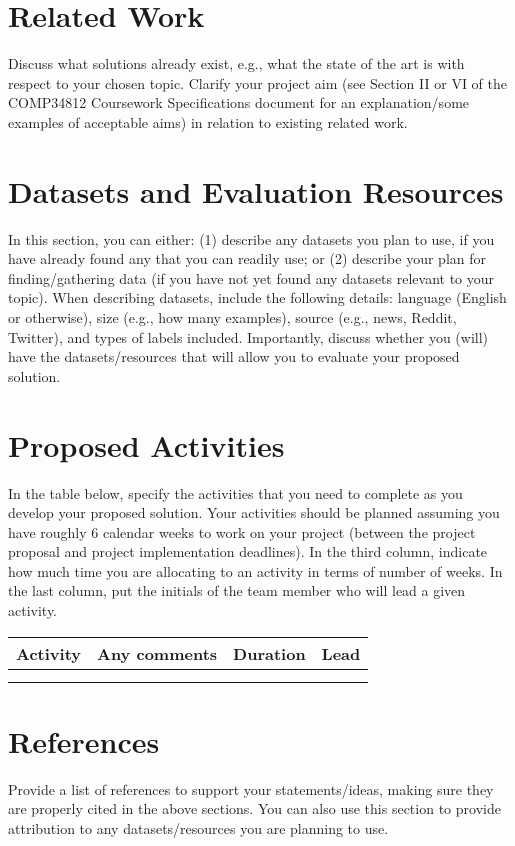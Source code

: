 \documentclass[11pt]{article}
\begin{document}
\section{Related Work}
Discuss what solutions already exist, e.g., what the state of the art is with respect to your chosen topic. Clarify your project aim (see Section II or VI of the COMP34812 Coursework Specifications document for an explanation/some examples of acceptable aims) in relation to existing related work.

\section{Datasets and Evaluation Resources}
In this section, you can either: (1) describe any datasets you plan to use, if you have already found any that you can readily use; or (2) describe your plan for finding/gathering data (if you have not yet found any datasets relevant to your topic). When describing datasets, include the following details: language (English or otherwise), size (e.g., how many examples), source (e.g., news, Reddit, Twitter), and types of labels included. Importantly, discuss whether you (will) have the datasets/resources that will allow you to evaluate your proposed solution. 



\section{Proposed Activities}
In the table below, specify the activities that you need to complete as you develop your proposed solution. Your activities should be planned assuming you have roughly 6 calendar weeks to work on your project (between the project proposal and project implementation deadlines). In the third column, indicate how much time you are allocating to an activity in terms of number of weeks. In the last column, put the initials of the team member who will lead a given activity.

\begin{table}[h]
\centering
\begin{tabular}{|l|l|c|c|}
\hline
\textbf{Activity} & \textbf{Any comments} & \textbf{Duration} & \textbf{Lead}\\
\hline
& & & \\
\hline
& & & \\
\hline
\end{tabular}
\end{table}


\section*{References}
Provide a list of references to support your statements/ideas, making sure they are properly cited in the above sections. You can also use this section to provide attribution to any datasets/resources you are planning to use.


\end{document}
